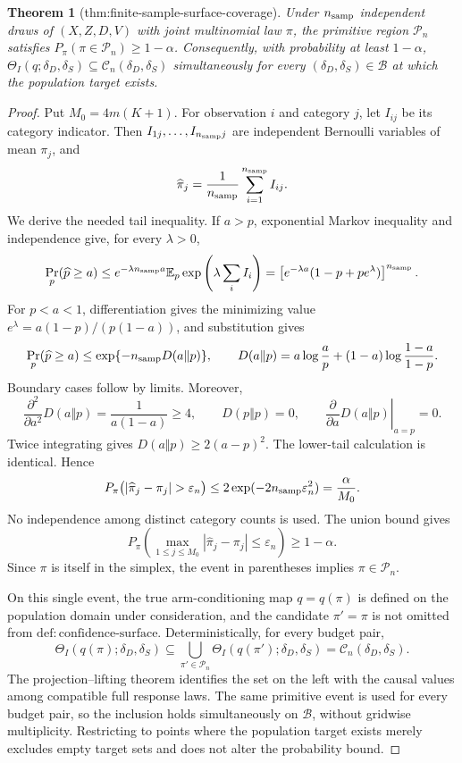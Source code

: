 \documentclass{article}
\newtheorem{theorem}{Theorem}
\begin{document}
\begin{theorem}[thm:finite-sample-surface-coverage]\label{thm:finite-sample-surface-coverage}
Under \(n_{\rm samp}\) independent draws of \((X,Z,D,V)\) with joint multinomial law \(\pi\), the primitive region \(\mathcal P_n\) satisfies \(P_{\pi}(\pi\in\mathcal P_n)\ge1-\alpha\). Consequently, with probability at least \(1-\alpha\), \(\Theta_I(q;\delta_D,\delta_S)\subseteq\mathcal C_n(\delta_D,\delta_S)\) simultaneously for every \((\delta_D,\delta_S)\in\mathcal B\) at which the population target exists.
\end{theorem}
\begin{proof}
Put \(M_0=4m(K+1)\). For observation \(i\) and category \(j\), let \(I_{ij}\) be its category indicator. Then \(I_{1j},\ldots,I_{n_{\rm samp}j}\) are independent Bernoulli variables of mean \(\pi_j\), and
\[
 \widehat\pi_j=\frac1{n_{\rm samp}}\sum_{i=1}^{n_{\rm samp}}I_{ij}.
\]
We derive the needed tail inequality. If \(a>p\), exponential Markov inequality and independence give, for every \(\lambda>0\),
\[
 \Pr_p(\widehat p\geq a)
 \leq e^{-\lambda n_{\rm samp}a}
      \mathbb E_p\exp\left(\lambda\sum_i I_i\right)
 =\left[e^{-\lambda a}(1-p+pe^\lambda)\right]^{n_{\rm samp}}.
\]
For \(p<a<1\), differentiation gives the minimizing value \(e^\lambda=a(1-p)/(p(1-a))\), and substitution gives
\[
 \Pr_p(\widehat p\geq a)
 \leq \exp\{-n_{\rm samp}D(a\Vert p)\},
 \qquad
 D(a\Vert p)=a\log\frac ap+(1-a)\log\frac{1-a}{1-p}.
\]
Boundary cases follow by limits. Moreover,
\[
 \frac{\partial^2}{\partial a^2}D(a\Vert p)
 =\frac1{a(1-a)}\geq4,
 \qquad D(p\Vert p)=0,
 \qquad \left.\frac{\partial}{\partial a}D(a\Vert p)\right|_{a=p}=0.
\]
Twice integrating gives \(D(a\Vert p)\geq2(a-p)^2\). The lower-tail calculation is identical. Hence
\[
 P_\pi\bigl(|\widehat\pi_j-\pi_j|>\varepsilon_n\bigr)
 \leq2\exp(-2n_{\rm samp}\varepsilon_n^2)
 =\frac{\alpha}{M_0}.
\]
No independence among distinct category counts is used. The union bound gives
\[
 P_\pi\left(\max_{1\leq j\leq M_0}
 |\widehat\pi_j-\pi_j|\leq\varepsilon_n\right)\geq1-\alpha.
\]
Since \(\pi\) is itself in the simplex, the event in parentheses implies \(\pi\in\mathcal P_n\).

On this single event, the true arm-conditioning map \(q=q(\pi)\) is defined on the population domain under consideration, and the candidate \(\pi'=\pi\) is not omitted from \(\mathrm{def:confidence\text{-}surface}\). Deterministically, for every budget pair,
\[
 \Theta_I(q(\pi);\delta_D,\delta_S)
 \subseteq
 \bigcup_{\pi'\in\mathcal P_n}
 \Theta_I(q(\pi');\delta_D,\delta_S)
 =\mathcal C_n(\delta_D,\delta_S).
\]
The projection--lifting theorem identifies the set on the left with the causal values among compatible full response laws. The same primitive event is used for every budget pair, so the inclusion holds simultaneously on \(\mathcal B\), without gridwise multiplicity. Restricting to points where the population target exists merely excludes empty target sets and does not alter the probability bound.
\end{proof}
\end{document}
